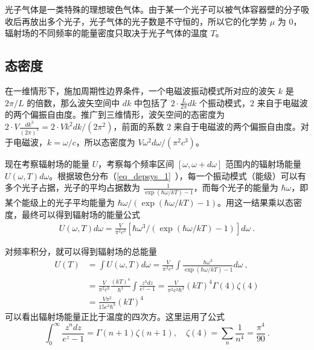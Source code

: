 
\begin{issues}
\issueDraft
\end{issues}
光子气体是一类特殊的理想玻色气体。由于某一个光子可以被气体容器壁的分子吸收后再放出多个光子，光子气体的光子数是不守恒的，所以它的化学势 $\mu$ 为 $0$，辐射场的不同频率的能量密度只取决于光子气体的温度 $T$。
\subsection{态密度}
在一维情形下，施加周期性边界条件，一个电磁波振动模式所对应的波矢 $k$ 是 $2\pi/L$ 的倍数，那么波矢空间中 $d k$ 中包括了 $2\cdot \frac{L}{2\pi} dk$ 个振动模式，$2$ 来自于电磁波的两个偏振自由度。推广到三维情形，波矢空间的态密度为 $2\cdot V \frac{dk^3}{(2\pi)^3}=2\cdot Vk^2dk/(2\pi^2)$，前面的系数 $2$ 来自于电磁波的两个偏振自由度。对于电磁波，$k=\omega/c$，所以态密度为 $V \omega^2 d\omega/(\pi^2 c^3)$。

现在考察辐射场的能量 $U$，考察每个频率区间 $[\omega,\omega+d\omega]$ 范围内的辐射场能量 $U(\omega,T)d\omega$。根据玻色分布（\autoref{eq_depsys_1}~），每一个振动模式（能级）可以有多个光子占据，光子的平均占据数为 $\frac{1}{\exp(\hbar\omega/kT)-1}$，而每个光子的能量为 $\hbar\omega$，即某个能级上的光子平均能量为 $\hbar\omega/(\exp(\hbar\omega/kT)-1)$。用这一结果乘以态密度，最终可以得到辐射场的能量公式
\begin{equation}
\begin{aligned}
U(\omega,T) d\omega=\frac{V}{\pi^2c^3} \left[\hbar\omega^3/(\exp(\hbar\omega/kT)-1)\right] d\omega~.
\end{aligned}
\end{equation}

对频率积分，就可以得到辐射场的总能量
\begin{equation}
\begin{aligned}
U(T)&=\int U(\omega,T) d\omega=\frac{V}{\pi^2c^3} \int \frac{\hbar\omega^3}{\exp(\hbar\omega/kT)-1} d\omega~,\\
&=\frac{V}{\pi^2c^3 } \frac{(kT)^4}{\hbar^3}\int \frac{z^3dz}{e^z-1}=\frac{V}{\pi^2c^3\hbar^3}(kT)^4\Gamma(4)\zeta(4)\\
&=\frac{V\pi^2}{15c^3\hbar^3}(kT)^4
\end{aligned}
\end{equation}
可以看出辐射场能量正比于温度的四次方。这里运用了公式
\begin{equation}\label{eq_PhoGas_1}
\int_0^\infty \frac{z^n dz}{e^z-1}=\Gamma(n+1)\zeta(n+1),\quad \zeta(4)=\sum_n \frac{1}{n^4}=\frac{\pi^4}{90}~.
\end{equation}


